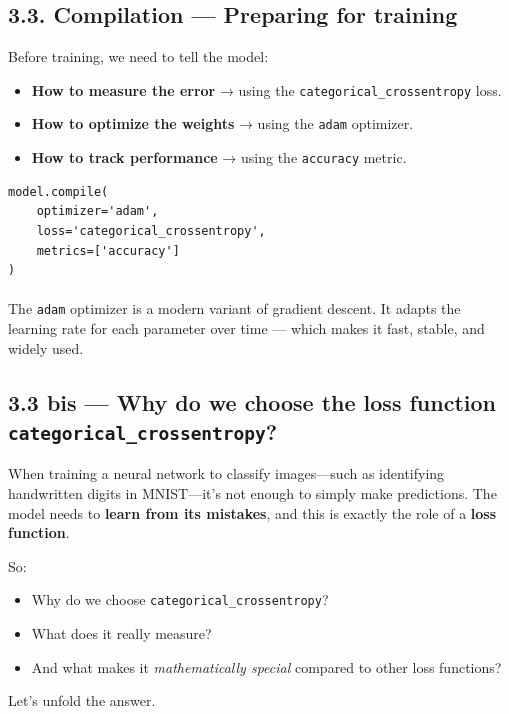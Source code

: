 \documentclass[11pt]{article}
\begin{document}
\subsection*{3.3. Compilation — Preparing for training}

Before training, we need to tell the model:

\begin{itemize}
    \item \textbf{How to measure the error} → using the \texttt{categorical\_crossentropy} loss.
    \item \textbf{How to optimize the weights} → using the \texttt{adam} optimizer.
    \item \textbf{How to track performance} → using the \texttt{accuracy} metric.
\end{itemize}

\begin{verbatim}
model.compile(
    optimizer='adam',
    loss='categorical_crossentropy',
    metrics=['accuracy']
)
\end{verbatim}

\paragraph{} The \texttt{adam} optimizer is a modern variant of gradient descent. It adapts the learning rate for each parameter over time — which makes it fast, stable, and widely used.

\subsection*{3.3 bis — Why do we choose the loss function \texttt{categorical\_crossentropy}?}

When training a neural network to classify images—such as identifying handwritten digits in MNIST—it’s not enough to simply make predictions. The model needs to \textbf{learn from its mistakes}, and this is exactly the role of a \textbf{loss function}.

\medskip
So:
\begin{itemize}
    \item Why do we choose \texttt{categorical\_crossentropy}?
    \item What does it really measure?
    \item And what makes it \emph{mathematically special} compared to other loss functions?
\end{itemize}

Let’s unfold the answer.
\end{document}
